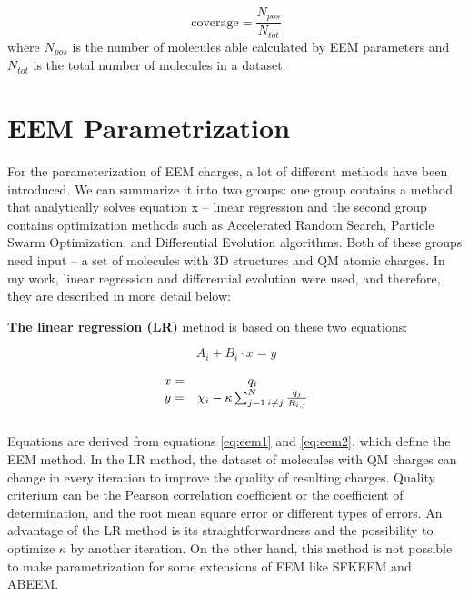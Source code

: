 \begin{equation}
    \mathrm{coverage} = \frac{N_{pos}}{N_{tot}}
\end{equation}
where $N_{pos}$ is the number of molecules able calculated by EEM parameters
and $N_{tot}$ is the total number of molecules in a dataset.

\section{EEM Parametrization}

For the parameterization of EEM charges, a lot of different methods have been
introduced. We can summarize it into two groups: one group contains
a method that analytically solves equation x -- linear
regression \cite{Svobodova2007, Jirouskova2009} and the
second group contains optimization methods \cite{Ouyang2009}  such as
Accelerated Random Search, Particle Swarm Optimization, and Differential
Evolution algorithms. Both of these groups need input -- a set of molecules
with 3D structures and QM atomic charges. In my work, linear regression and
differential evolution were used, and therefore, they are described in more
detail below:

\textbf{The linear regression (LR)} method is based on these two equations:

\begin{equation} \label{eq:eem1}
    A_i + B_i \cdot x = y
\end{equation}

\begin{equation} \label{eq:eem2}
    \begin{array}{cc}
    x =& q_i \\
    \vspace{3mm}
    y =& \chi_i - \kappa \sum^N_{j=1 \: i\neq{j}} \frac{q_j}{R_{i,j}} \\
    \end{array}
\end{equation}

Equations are derived from equations \ref{eq:eem1} and \ref{eq:eem2}, which
define the EEM method. In the LR method, the dataset of molecules with QM
charges can change in every iteration to improve the quality of resulting
charges. Quality criterium can be the Pearson correlation coefficient or
the coefficient of determination, and the root mean square error or different
types of errors.  An advantage of the LR method is its straightforwardness and
the possibility to optimize $\kappa$ by another iteration. On the other hand,
this method is not possible to make parametrization for some extensions of EEM
like SFKEEM and ABEEM.

